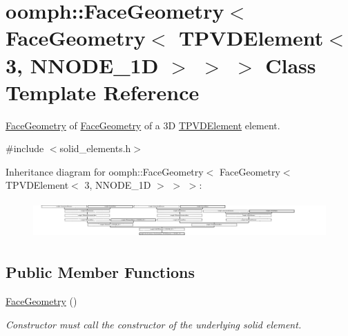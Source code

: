 \hypertarget{classoomph_1_1FaceGeometry_3_01FaceGeometry_3_01TPVDElement_3_013_00_01NNODE__1D_01_4_01_4_01_4}{}\section{oomph\+:\+:Face\+Geometry$<$ Face\+Geometry$<$ T\+P\+V\+D\+Element$<$ 3, N\+N\+O\+D\+E\+\_\+1D $>$ $>$ $>$ Class Template Reference}
\label{classoomph_1_1FaceGeometry_3_01FaceGeometry_3_01TPVDElement_3_013_00_01NNODE__1D_01_4_01_4_01_4}


\hyperlink{classoomph_1_1FaceGeometry}{Face\+Geometry} of \hyperlink{classoomph_1_1FaceGeometry}{Face\+Geometry} of a 3D \hyperlink{classoomph_1_1TPVDElement}{T\+P\+V\+D\+Element} element.  




{\ttfamily \#include $<$solid\+\_\+elements.\+h$>$}

Inheritance diagram for oomph\+:\+:Face\+Geometry$<$ Face\+Geometry$<$ T\+P\+V\+D\+Element$<$ 3, N\+N\+O\+D\+E\+\_\+1D $>$ $>$ $>$\+:\begin{figure}[H]
\begin{center}
\leavevmode
\includegraphics[height=1.414141cm]{classoomph_1_1FaceGeometry_3_01FaceGeometry_3_01TPVDElement_3_013_00_01NNODE__1D_01_4_01_4_01_4}
\end{center}
\end{figure}
\subsection*{Public Member Functions}
\begin{DoxyCompactItemize}
\item 
\hyperlink{classoomph_1_1FaceGeometry_3_01FaceGeometry_3_01TPVDElement_3_013_00_01NNODE__1D_01_4_01_4_01_4_aa9ef718fe118405299ea8deed6d43712}{Face\+Geometry} ()
\begin{DoxyCompactList}\small\item\em Constructor must call the constructor of the underlying solid element. \end{DoxyCompactList}\end{DoxyCompactItemize}
